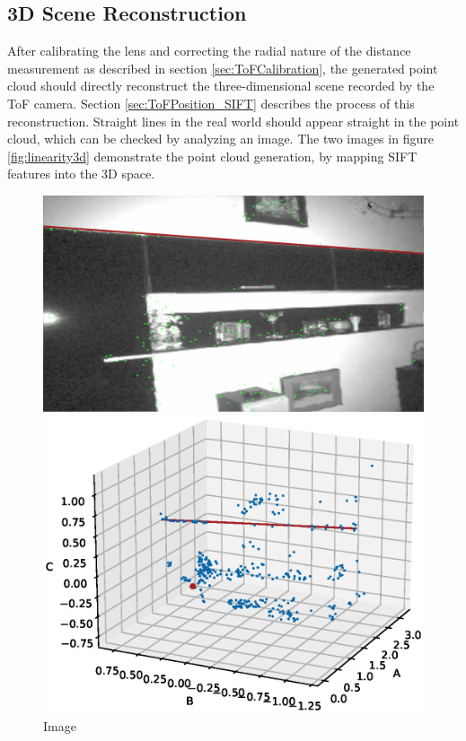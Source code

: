 \subsection{3D Scene Reconstruction}
After calibrating the lens and correcting the radial nature of the distance measurement as described in section \ref{sec:ToFCalibration}, the generated point cloud should directly reconstruct the three-dimensional scene recorded by the ToF camera. Section \ref{sec:ToFPosition_SIFT} describes the process of this reconstruction.
Straight lines in the real world should appear straight in the point cloud, which can be checked by analyzing an image. The two images in figure \ref{fig:linearity3d} demonstrate the point cloud generation, by mapping SIFT features into the 3D space. 
\begin{figure}[H]
    \centering
    \begin{minipage}[b]{0.45\textwidth}
      \includegraphics[scale=0.105]{images/cloud_3d_linearity_image.png}
      \caption{Image}
      \label{fig:linearity3d_image} 
    \end{minipage} %
    \begin{minipage}[b]{0.45\textwidth}
      \includegraphics[scale=0.40]{images/linearity_3d.eps} 

\end{minipage}
\end{figure}

